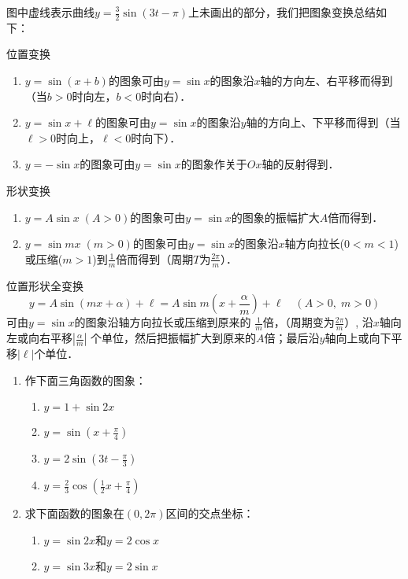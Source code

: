 图中虚线表示曲线$y=\frac{3}{2}\sin(3t-\pi)$上未画出的部分，我们把图象变换总结如下：

\begin{blk}{位置变换}
\begin{enumerate}
    \item $y=\sin(x+b)$的图象可由$y=\sin x$的图象沿$x$轴的方向左、右平移而得到（当$b>0$时向左，$b<0$时向右）．
    \item $y=\sin x+\ell$的图象可由$y=\sin x$的图象沿$y$轴的方向上、下平移而得到（当$\ell>0$时向上，$\ell<0$时向下）．
    \item $y=-\sin x$的图象可由$y=\sin x$的图象作关于$Ox$轴的反射得到．
\end{enumerate}
\end{blk}

\begin{blk}{形状变换}
    \begin{enumerate}
        \item $y=A\sin x\; (A>0)$的图象可由$y=\sin x$的图象的振幅扩大$A$倍而得到．
\item $y=\sin mx\; (m>0)$的图象可由$y=\sin x$的图象沿$x$轴方向拉长($0<m<1$)或压缩($m>1$)到$\frac{1}{m}$倍而得到（周期$T$为$\frac{2\pi}{m}$）．
    \end{enumerate}
\end{blk}


\begin{blk}{位置形状全变换}
\[y=A\sin(mx+\alpha)+\ell=A\sin m\left(x+\frac{\alpha}{m}\right) +\ell\quad  (A> 0,\; m>0)\]
可由$y=\sin x$的图象沿轴方向拉长或压缩到原来的
$\frac{1}{m}$倍，（周期变为$\frac{2\pi}{m}$）, 沿$x$轴向左或向右平移$\left|\frac{\alpha}{m}\right|$
个单位，然后把振幅扩大到原来的$A$倍；最后沿$y$轴向上或向下平移$|\ell|$个单位．
\end{blk}

\begin{ex}
\begin{enumerate}
    \item 作下面三角函数的图象：
    \begin{multicols}{2}
\begin{enumerate}
    \item $y=1+\sin2x$
    \item $y=\sin\left(x+\frac{\pi}{4}\right) $
    \item $y=2\sin\left(3t-\frac{\pi}{3}\right)$
    \item $y=\frac{2}{3}\cos\left(\frac{1}{2}x+\frac{\pi}{4}\right)$
\end{enumerate}
    \end{multicols}
    \item 求下面函数的图象在$(0, 2\pi)$区间的交点坐标：
    \begin{enumerate}
        \item $y=\sin 2x$和$y=2\cos x$
        \item $y=\sin 3x$和$y=2\sin x$
    \end{enumerate}
\end{enumerate}
\end{ex}

